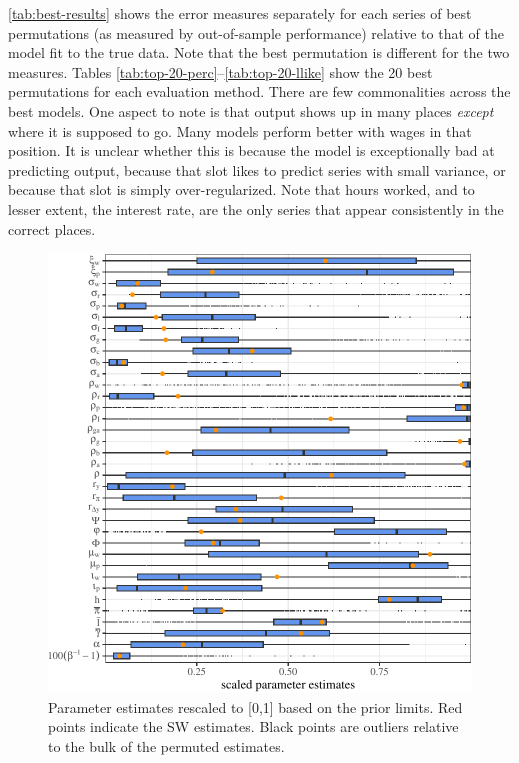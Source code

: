 \documentclass[11pt]{article}
\begin{document}
\autoref{tab:best-results} shows the error measures separately for each
series of best permutations (as measured by out-of-sample performance)
relative to that of the model fit to the true data. Note that the best
permutation is different for the two measures. Tables
\ref{tab:top-20-perc}--\ref{tab:top-20-llike} show the 20 best
permutations for each evaluation method. There are few commonalities
across the best models. One aspect to note is that output shows up in
many places \emph{except} where it is supposed to go. Many models
perform better with wages in that position. It is unclear whether this
is because the model is exceptionally bad at predicting output, because
that slot likes to predict series with small variance, or because that
slot is simply over-regularized. Note that hours worked, and to lesser
extent, the interest rate, are the only series that appear consistently
in the correct places.

\begin{figure}[t]

{\centering \includegraphics{gfx/scaled-parameter-boxplots-1} 

}

\caption{Parameter estimates rescaled to [0,1] based on the prior limits. Red points indicate the SW estimates. Black points are outliers relative to the bulk of the permuted estimates.}\label{fig:scaled-parameter-boxplots}
\end{figure}
\end{document}
